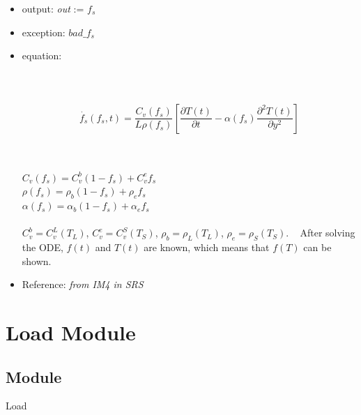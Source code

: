 \documentclass[12pt, titlepage]{article}
\begin{document}
\begin{itemize}

\item output: \textit{out} := $f_s$
\item exception: $bad\_f_s$
\item equation:
 \\
 \\
 ~\newline
{}\\
\\  
\begin{equation*}
\dot{f_s}(f_s, t) = \frac{C_v(f_s)}{L \rho(f_s)} \left [ \frac{\partial
            T(t)}{\partial t} - \alpha(f_s)\frac{\partial^2 T(t)}{\partial y^2}
            \right ] 
\end{equation*}            
~\newline

\\
$C_v(f_s) = C_v^b(1 - f_s) + C_v^e f_s$\\
 $\rho(f_s) = \rho_{b}(1 - f_s) + \rho_{e} f_s$\\
 $\alpha(f_s) = \alpha_{b}(1 - f_s) + \alpha_{e} f_s$\\
\newline 
{}\\
 $C_v^b = C_v^L(T_L)$,
 $C_v^e = C_v^S(T_S)$, $\rho_b = \rho_L(T_L)$, 
 $\rho_e = \rho_S(T_S)$.
  ~\newline
  After solving the ODE, $f(t)$ and $T(t)$ are known, which means that $f(T)$ can be shown.\\
         
\item Reference: \textit{from IM4 in SRS}  

\end{itemize}






\newpage

\section{Load Module}\label{load}

\subsection {Module}

Load
\end{document}
